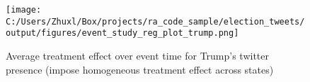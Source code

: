\documentclass{article}
\begin{document}
\begin{figure}[h]
	\begin{center}
		\texttt{[image: C:/Users/Zhuxl/Box/projects/ra\_code\_sample/election\_tweets/output/figures/event\_study\_reg\_plot\_trump.png]}
		\caption{Average treatment effect over event time for Trump's twitter presence (impose homogeneous treatment effect across states)} \label{fig:2}
	\end{center}
\end{figure}
\end{document}
